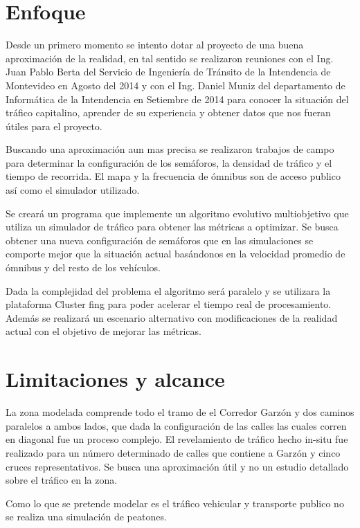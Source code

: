 
\section{Enfoque}

Desde un primero momento se intento dotar al proyecto de una buena aproximación de la realidad, en tal sentido se realizaron reuniones con el Ing. Juan Pablo Berta del Servicio de Ingeniería de Tránsito de la Intendencia de Montevideo en Agosto del  2014 y con el Ing. Daniel Muniz del departamento de Informática de la Intendencia en Setiembre de 2014 para conocer la situación del tráfico capitalino, aprender de su experiencia y obtener datos que nos fueran útiles para el proyecto.


Buscando una aproximación aun mas precisa se realizaron trabajos de campo para determinar la configuración de los semáforos, la densidad de tráfico y el tiempo de recorrida. El mapa y la frecuencia de ómnibus son de acceso publico así como el simulador utilizado.

Se creará un programa que implemente un algoritmo evolutivo multiobjetivo que utiliza un simulador de tráfico para obtener las métricas a optimizar. Se busca obtener una nueva configuración de semáforos que en las simulaciones se comporte mejor que la situación actual basándonos en la velocidad promedio de ómnibus y del resto de los vehículos.

Dada la complejidad del problema el algoritmo será paralelo y se utilizara la plataforma Cluster fing para poder acelerar el tiempo real de procesamiento. Además se realizará un escenario alternativo con modificaciones de la realidad actual con el objetivo de mejorar las métricas.

\section{Limitaciones y alcance}

La zona modelada comprende todo el tramo de el Corredor Garzón y dos caminos paralelos a ambos lados, que dada la configuración de las calles las cuales corren en diagonal fue un proceso complejo.
El revelamiento de tráfico hecho in-situ fue realizado para un número determinado de calles que contiene a Garzón y cinco cruces representativos. Se busca una aproximación útil y no un estudio detallado sobre el tráfico en la zona.

Como lo que se pretende modelar es el tráfico vehicular y transporte publico no se realiza una simulación de peatones.


